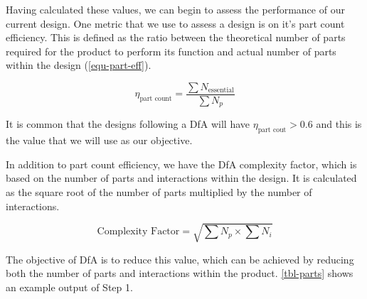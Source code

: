 Having calculated these values, we can begin to assess the performance of our current design. One metric that we use to assess a design is on it's part count efficiency. This is defined as the ratio between the theoretical number of parts required for the product to perform its function and actual number of parts within the design (\cref{equ-part-eff}).

\begin{equation}
  \eta_{\text{part count}} = \frac{\sum{N_\text{essential}}}{\sum{N_p}}
  \label{equ-part-eff}
\end{equation}


It is common that the designs following a DfA will have $\eta_{\text{part cout}}>0.6$ and this is the value that we will use as our objective.

In addition to part count efficiency, we have the \ac{DfA} complexity factor, which is based on the number of parts and interactions within the design. It is calculated as the square root of the number of parts multiplied by the number of interactions.

\begin{equation}
  \text{Complexity Factor} = \sqrt{\sum{N_p}\times\sum{N_i}}
\end{equation} 


The objective of \ac{DfA} is to reduce this value, which can be achieved by reducing both the number of parts and interactions within the product. \cref{tbl-parts} shows an example output of Step 1.


